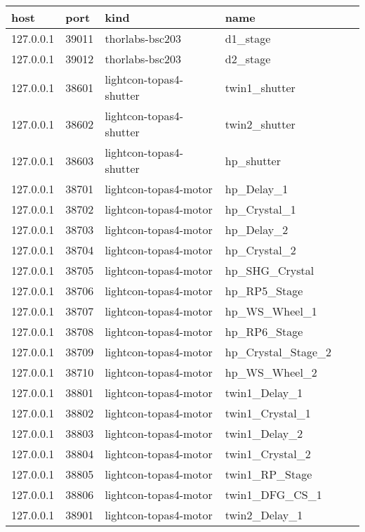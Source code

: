 \begin{table}[]
\begin{tabular}{llllll}
\hline
host      & port  & kind                    & name               \\ \hline
127.0.0.1 & 39011 & thorlabs-bsc203         & d1\_stage          \\
127.0.0.1 & 39012 & thorlabs-bsc203         & d2\_stage          \\
127.0.0.1 & 38601 & lightcon-topas4-shutter & twin1\_shutter     \\
127.0.0.1 & 38602 & lightcon-topas4-shutter & twin2\_shutter     \\
127.0.0.1 & 38603 & lightcon-topas4-shutter & hp\_shutter        \\
127.0.0.1 & 38701 & lightcon-topas4-motor   & hp\_Delay\_1       \\
127.0.0.1 & 38702 & lightcon-topas4-motor   & hp\_Crystal\_1     \\
127.0.0.1 & 38703 & lightcon-topas4-motor   & hp\_Delay\_2       \\
127.0.0.1 & 38704 & lightcon-topas4-motor   & hp\_Crystal\_2     \\
127.0.0.1 & 38705 & lightcon-topas4-motor   & hp\_SHG\_Crystal   \\
127.0.0.1 & 38706 & lightcon-topas4-motor   & hp\_RP5\_Stage     \\
127.0.0.1 & 38707 & lightcon-topas4-motor   & hp\_WS\_Wheel\_1   \\
127.0.0.1 & 38708 & lightcon-topas4-motor   & hp\_RP6\_Stage     \\
127.0.0.1 & 38709 & lightcon-topas4-motor   & hp\_Crystal\_Stage\_2 \\
127.0.0.1 & 38710 & lightcon-topas4-motor   & hp\_WS\_Wheel\_2   \\
127.0.0.1 & 38801 & lightcon-topas4-motor   & twin1\_Delay_1     \\
127.0.0.1 & 38802 & lightcon-topas4-motor   & twin1\_Crystal\_1  \\
127.0.0.1 & 38803 & lightcon-topas4-motor   & twin1\_Delay\_2    \\
127.0.0.1 & 38804 & lightcon-topas4-motor   & twin1\_Crystal\_2  \\
127.0.0.1 & 38805 & lightcon-topas4-motor   & twin1\_RP\_Stage   \\
127.0.0.1 & 38806 & lightcon-topas4-motor   & twin1\_DFG\_CS\_1  \\
127.0.0.1 & 38901 & lightcon-topas4-motor   & twin2\_Delay\_1    \\

\end{tabular}
\end{table}
